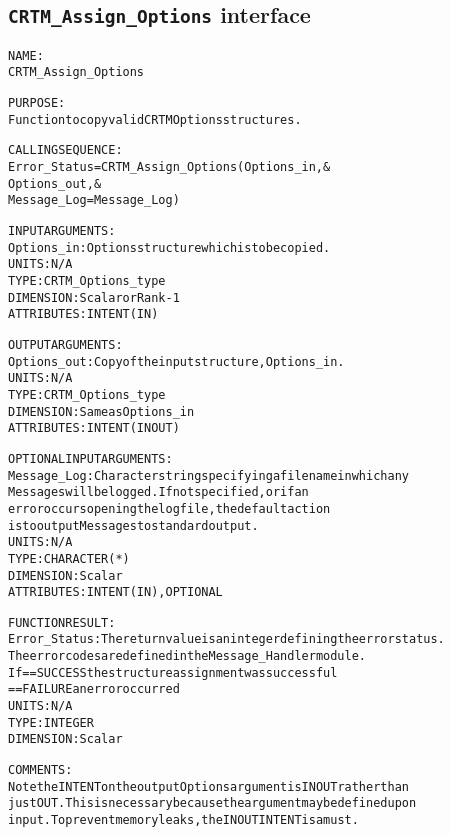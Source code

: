 \subsection{\texttt{CRTM\_Assign\_Options} interface}
  \label{sec:CRTM_Assign_Options_interface}
  \begin{alltt}
 
  NAME:
        CRTM_Assign_Options
 
  PURPOSE:
        Function to copy valid CRTM Options structures.
 
  CALLING SEQUENCE:
        Error_Status = CRTM_Assign_Options( Options_in             , &
                                            Options_out            , &
                                            Message_Log=Message_Log  )
 
  INPUT ARGUMENTS:
        Options_in:      Options structure which is to be copied.
                         UNITS:      N/A
                         TYPE:       CRTM_Options_type
                         DIMENSION:  Scalar or Rank-1
                         ATTRIBUTES: INTENT(IN)
 
  OUTPUT ARGUMENTS:
        Options_out:     Copy of the input structure, Options_in.
                         UNITS:      N/A
                         TYPE:       CRTM_Options_type
                         DIMENSION:  Same as Options_in
                         ATTRIBUTES: INTENT(IN OUT)
 
  OPTIONAL INPUT ARGUMENTS:
        Message_Log:     Character string specifying a filename in which any
                         Messages will be logged. If not specified, or if an
                         error occurs opening the log file, the default action
                         is to output Messages to standard output.
                         UNITS:      N/A
                         TYPE:       CHARACTER(*)
                         DIMENSION:  Scalar
                         ATTRIBUTES: INTENT(IN), OPTIONAL
 
  FUNCTION RESULT:
        Error_Status:    The return value is an integer defining the error status.
                         The error codes are defined in the Message_Handler module.
                         If == SUCCESS the structure assignment was successful
                            == FAILURE an error occurred
                         UNITS:      N/A
                         TYPE:       INTEGER
                         DIMENSION:  Scalar
 
  COMMENTS:
        Note the INTENT on the output Options argument is IN OUT rather than
        just OUT. This is necessary because the argument may be defined upon
        input. To prevent memory leaks, the IN OUT INTENT is a must.
 
  \end{alltt}
